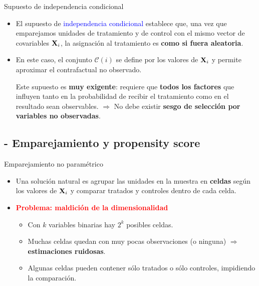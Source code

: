 \documentclass[10pt, xcolor=dvipsnames]{beamer}
\begin{document}
\begin{frame}{Supuesto de independencia condicional}
\begin{itemize}
     \item El supuesto de \textcolor{blue}{independencia condicional} establece que, una vez que emparejamos unidades de tratamiento y de control con el mismo vector de covariables \(\textbf{X}_i\), la asignación al tratamiento es \textbf{como si fuera aleatoria}. %
     \vspace{0.5em}
    \item En este caso, el conjunto \(\mathcal{C}(i)\) se define por los valores de \(\textbf{X}_i\) y permite aproximar el contrafactual no observado. %
    \vspace{0.5em}
    \begin{tcolorbox}[colback=white, title=Implicaciones del supuesto, arc=0mm,boxrule=0.5pt, breakable]	
        Este supuesto es \textbf{muy exigente}: requiere que \textbf{todos los factores} que influyen tanto en la probabilidad de recibir el tratamiento como en el resultado sean observables.  \(\Rightarrow\) No debe existir \textbf{sesgo de selección por variables no observadas}. 
    \end{tcolorbox}
\end{itemize}
\end{frame}



\subsection{- Emparejamiento y propensity score}

\begin{frame}{Emparejamiento no paramétrico}
    \begin{itemize}
        \item Una solución natural es agrupar las unidades en la muestra en \textbf{celdas} según los valores de \(\textbf{X}_i\) y comparar tratados y controles dentro de cada celda.
        \vspace{1em}
        \item \textcolor{red}{\textbf{Problema: maldición de la dimensionalidad}}
        \begin{itemize}
            \item Con \(k\) variables binarias hay \(2^k\) posibles celdas. %
            \item Muchas celdas quedan con muy pocas observaciones (o ninguna) \(\Rightarrow\) \textbf{estimaciones ruidosas}. %
            \item Algunas celdas pueden contener sólo tratados o sólo controles, impidiendo la comparación.
        \end{itemize}
    \end{itemize}
\end{frame}
\end{document}
